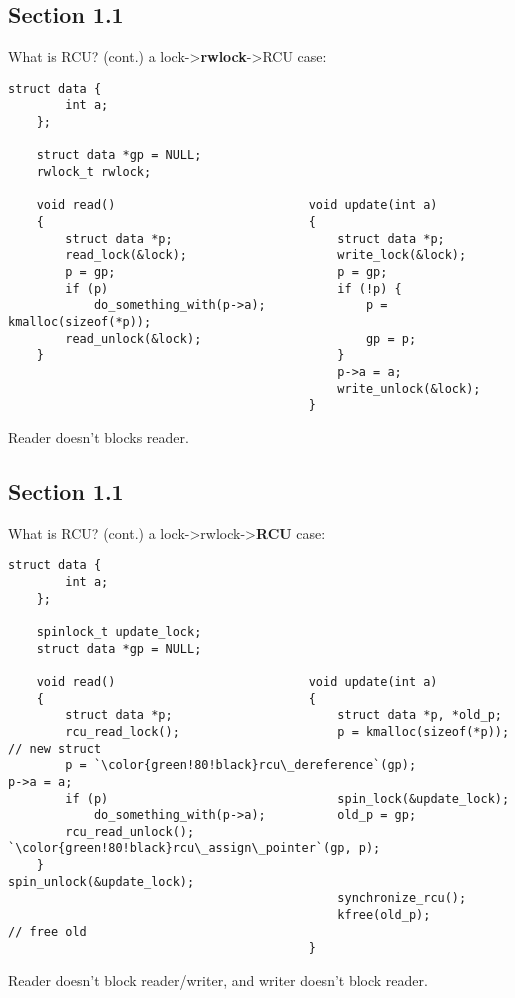 \documentclass[handout]{beamer}
\begin{document}
\subsection{Section 1.1}
\begin{frame}[fragile]{What is RCU? (cont.)}
    a lock->\textbf{\color{red}rwlock}->RCU case:
    \begin{lstlisting}[emph={rwlock_t, read_lock, read_unlock, write_lock, write_unlock}]
    struct data {
        int a;
    };

    struct data *gp = NULL;
    rwlock_t rwlock;

    void read()                           void update(int a)
    {                                     {
        struct data *p;                       struct data *p;
        read_lock(&lock);                     write_lock(&lock);
        p = gp;                               p = gp;
        if (p)                                if (!p) {
            do_something_with(p->a);              p = kmalloc(sizeof(*p));
        read_unlock(&lock);                       gp = p;
    }                                         }
                                              p->a = a;
                                              write_unlock(&lock);
                                          }
    \end{lstlisting}
    Reader doesn't blocks reader.
\end{frame}

\subsection{Section 1.1}
\begin{frame}[fragile]{What is RCU? (cont.)}
    a lock->rwlock->\textbf{\color{red}RCU} case:
    \begin{lstlisting}[emph={rcu_read_lock,rcu_read_unlock,synchronize_rcu}]
    struct data {
        int a;
    };

    spinlock_t update_lock;
    struct data *gp = NULL;

    void read()                           void update(int a)
    {                                     {
        struct data *p;                       struct data *p, *old_p;
        rcu_read_lock();                      p = kmalloc(sizeof(*p)); // new struct
        p = `\color{green!80!black}rcu\_dereference`(gp);              p->a = a;
        if (p)                                spin_lock(&update_lock);
            do_something_with(p->a);          old_p = gp;
        rcu_read_unlock();                    `\color{green!80!black}rcu\_assign\_pointer`(gp, p);
    }                                         spin_unlock(&update_lock);
                                              synchronize_rcu();
                                              kfree(old_p);            // free old
                                          }
    \end{lstlisting}
    Reader doesn't block reader/writer, and writer doesn't block reader.
\end{frame}
\end{document}
